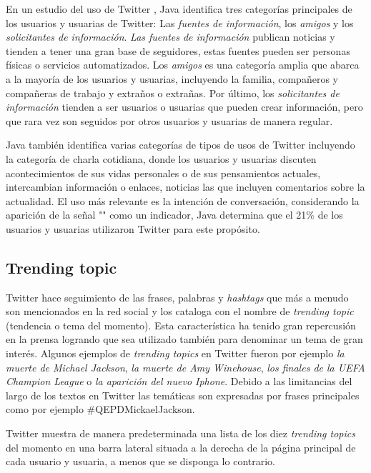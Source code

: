 En un estudio del uso de Twitter \cite{JavaEtAl:07}, Java  identifica tres categorías principales de los usuarios y usuarias de Twitter: Las \emph{fuentes de información}, los \emph{amigos} y los \emph{solicitantes de información}.
\emph{Las fuentes de información} publican noticias y tienden a tener una gran base de seguidores, estas fuentes pueden ser personas físicas o servicios automatizados. Los \emph{amigos} es una categoría amplia que abarca a la mayoría de los usuarios y usuarias, incluyendo la familia, compañeros y compañeras de trabajo y extraños o extrañas. Por último, los \emph{solicitantes de información} tienden a ser usuarios o usuarias que pueden crear información, pero que rara vez son seguidos por otros usuarios y usuarias de manera regular.

Java \cite{JavaEtAl:07} también identifica varias categorías de tipos de usos de Twitter incluyendo la categoría de charla cotidiana, donde los usuarios y usuarias discuten acontecimientos de sus vidas personales o de sus pensamientos actuales, intercambian información o enlaces, noticias las que incluyen comentarios sobre la actualidad. El uso más relevante es la intención de conversación, considerando la aparición de la señal "\@" como un indicador, Java determina que el 21\% de los usuarios y usuarias utilizaron Twitter para este propósito.

\subsection{Trending topic}

Twitter hace seguimiento de	 las frases, palabras y \emph{hashtags} que más a menudo son mencionados en la red social y los cataloga con el nombre de \emph{trending topic} (tendencia o tema del momento).
 Esta característica ha tenido gran repercusión en la prensa logrando que sea utilizado también para denominar un tema de gran interés. Algunos ejemplos de \emph{trending topics} en Twitter fueron por ejemplo \emph{la muerte de Michael Jackson}, \emph{la muerte de Amy Winehouse}, \emph{los finales de la UEFA Champion League} o \emph{la aparición del nuevo Iphone}. Debido a las limitancias del largo de los textos en Twitter las temáticas son expresadas por frases principales como por ejemplo \#QEPDMickaelJackson.
 
 Twitter muestra de manera predeterminada una lista de los diez \emph{trending topics} del momento en una barra lateral situada a la derecha de la página principal de cada usuario y usuaria, a menos que se disponga lo contrario.

